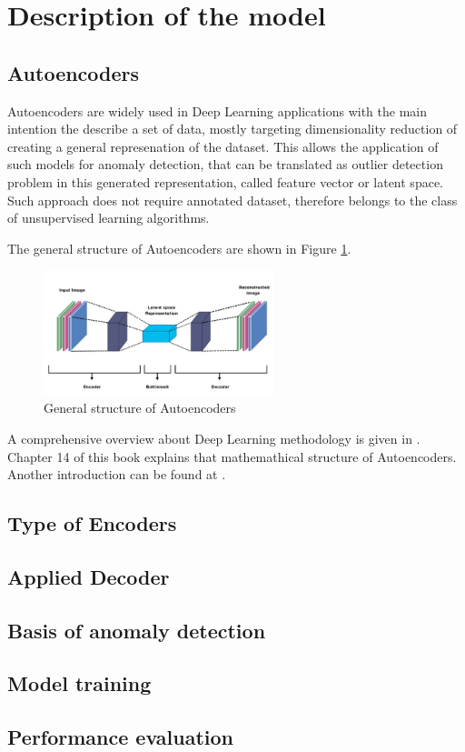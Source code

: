 \section{Description of the model} \label{model}
\subsection{Autoencoders}
Autoencoders are widely used in Deep Learning applications with the main intention
the describe a set of data, mostly targeting dimensionality reduction of creating
a general represenation of the dataset.
This allows the application of such models for anomaly detection, that can be translated
as outlier detection problem in this generated representation,
called feature vector or latent space.
Such approach does not require annotated dataset, therefore belongs to the class of
unsupervised learning algorithms.

The general structure of Autoencoders are shown in Figure \ref{fig:autoencoder}.

\begin{figure}[!ht]
    \centering
    \includegraphics[width=0.6\textwidth]{./tex_images/autoencoder.jpeg}
    \caption{General structure of Autoencoders \cite{khosla_auto_2021}}
    \label{fig:autoencoder}
\end{figure}

A comprehensive overview about Deep Learning methodology is given in \cite{Goodfellow-et-al-2016}.
Chapter 14 of this book explains that mathemathical structure of Autoencoders.
Another introduction can be found at \cite{_autoencoder_2023}.

\subsection{Type of Encoders}
\subsection{Applied Decoder}
\subsection{Basis of anomaly detection}
\subsection{Model training}
\subsection{Performance evaluation}
